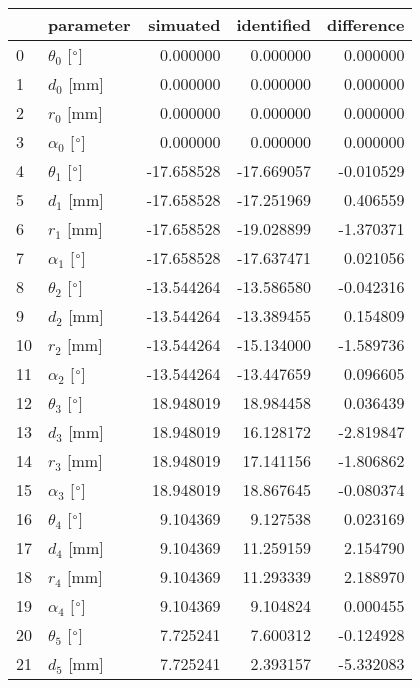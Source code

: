 \documentclass{standalone}%
\begin{document}
%
\normalsize%
\begin{tabular}{llrrr}
\toprule
{} &                 parameter &   simuated & identified & difference \\
\midrule
0  &  $\theta_{0}$ [$\degree$] &   0.000000 &   0.000000 &   0.000000 \\
1  &              $d_{0}$ [mm] &   0.000000 &   0.000000 &   0.000000 \\
2  &              $r_{0}$ [mm] &   0.000000 &   0.000000 &   0.000000 \\
3  &  $\alpha_{0}$ [$\degree$] &   0.000000 &   0.000000 &   0.000000 \\
4  &  $\theta_{1}$ [$\degree$] & -17.658528 & -17.669057 &  -0.010529 \\
5  &              $d_{1}$ [mm] & -17.658528 & -17.251969 &   0.406559 \\
6  &              $r_{1}$ [mm] & -17.658528 & -19.028899 &  -1.370371 \\
7  &  $\alpha_{1}$ [$\degree$] & -17.658528 & -17.637471 &   0.021056 \\
8  &  $\theta_{2}$ [$\degree$] & -13.544264 & -13.586580 &  -0.042316 \\
9  &              $d_{2}$ [mm] & -13.544264 & -13.389455 &   0.154809 \\
10 &              $r_{2}$ [mm] & -13.544264 & -15.134000 &  -1.589736 \\
11 &  $\alpha_{2}$ [$\degree$] & -13.544264 & -13.447659 &   0.096605 \\
12 &  $\theta_{3}$ [$\degree$] &  18.948019 &  18.984458 &   0.036439 \\
13 &              $d_{3}$ [mm] &  18.948019 &  16.128172 &  -2.819847 \\
14 &              $r_{3}$ [mm] &  18.948019 &  17.141156 &  -1.806862 \\
15 &  $\alpha_{3}$ [$\degree$] &  18.948019 &  18.867645 &  -0.080374 \\
16 &  $\theta_{4}$ [$\degree$] &   9.104369 &   9.127538 &   0.023169 \\
17 &              $d_{4}$ [mm] &   9.104369 &  11.259159 &   2.154790 \\
18 &              $r_{4}$ [mm] &   9.104369 &  11.293339 &   2.188970 \\
19 &  $\alpha_{4}$ [$\degree$] &   9.104369 &   9.104824 &   0.000455 \\
20 &  $\theta_{5}$ [$\degree$] &   7.725241 &   7.600312 &  -0.124928 \\
21 &              $d_{5}$ [mm] &   7.725241 &   2.393157 &  -5.332083 \\

\end{tabular}
\end{document}
